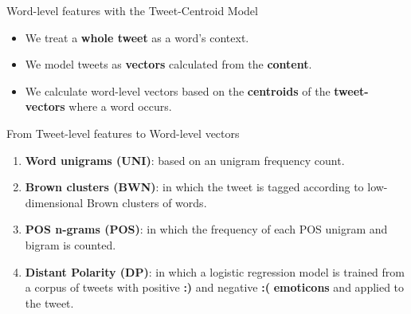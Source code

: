 \documentclass[handout]{beamer}
\begin{document}
\begin{frame}{Word-level features with the Tweet-Centroid Model}
\begin{scriptsize}
\begin{itemize} 
\item We treat a \textbf{whole tweet} as a word's context.
\item We model tweets as \textbf{vectors} calculated from the \textbf{content}.
\item We calculate word-level vectors based on the \textbf{centroids} of the \textbf{tweet-vectors} where a word occurs.
\end{itemize}
\end{scriptsize}
\end{frame}


\begin{frame}{From Tweet-level features to Word-level vectors}
\begin{scriptsize}
\begin{enumerate} 
\item \textbf{Word unigrams (UNI)}: based on an unigram frequency count.
\item \textbf{Brown clusters (BWN)}: in which the tweet is tagged according to low-dimensional Brown clusters of words. 
\item \textbf{POS n-grams (POS)}: in which the frequency of each POS unigram and bigram is counted.  
\item  \textbf{Distant Polarity (DP)}: in which a logistic regression model is trained from a corpus of tweets with positive \textbf{:)} and negative \textbf{:(} \textbf{emoticons} and applied to the tweet.
\end{enumerate}
\end{scriptsize}
\end{frame}
\end{document}

